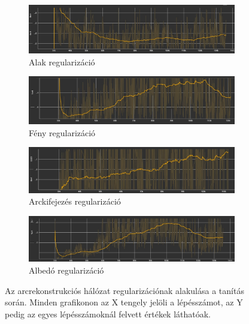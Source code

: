 \documentclass[12pt,a4]{article}
\begin{document}
        \begin{figure}[h!]
            \centering
            \begin{subfigure}[b]{0.55\textwidth}
               \includegraphics[width=1\linewidth]{coarse-shape-reg.jpg}
               \caption{Alak regularizáció }
               \label{fig:coarse-shape-reg} 
            \end{subfigure}
            
            \begin{subfigure}[b]{0.55\textwidth}
               \includegraphics[width=1\linewidth]{coarse-light-reg.jpg}
               \caption{Fény regularizáció}
               \label{fig:coarse-light-reg} 
            \end{subfigure}

            \begin{subfigure}[b]{0.55\textwidth}
               \includegraphics[width=1\linewidth]{coarse-exp-reg.jpg}
               \caption{Arckifejezés regularizáció}
               \label{fig:coarse-exp-reg} 
            \end{subfigure}

            \begin{subfigure}[b]{0.55\textwidth}
               \includegraphics[width=1\linewidth]{coarse-tex-reg.jpg}
               \caption{Albedó regularizáció}
               \label{fig:coarse-tex-reg} 
            \end{subfigure}
            \caption{Az arcrekonstrukciós hálózat regularizációnak alakulása a tanítás során. Minden grafikonon az X tengely jelöli a lépésszámot, az Y pedig az egyes lépésszámoknál felvett értékek láthatóak.}
            \label{fig:coarse-reg-results}
        \end{figure}
\end{document}
